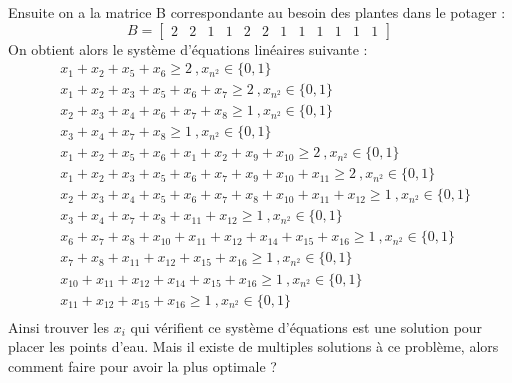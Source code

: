 \documentclass[french,a4paper]{article}
\begin{document}
\newline
Ensuite on a la matrice B correspondante au besoin des plantes dans le potager :
\newline
\[B = \begin{bmatrix} 2 & 2 & 1 & 1 & 2 & 2 & 1 & 1 & 1 & 1 & 1 & 1 \end{bmatrix}\]
\newline
On obtient alors le système d'équations linéaires suivante :
\newline
\begin{equation}
    \begin{aligned}
         & x_1+x_2+x_5+x_6 \ge 2 \ , x_{n^2} \in \{0,1\}                                       \\
         & x_1+x_2+x_3+x_5+x_6+x_7 \ge 2 \ , x_{n^2} \in \{0,1\}                               \\
         & x_2+x_3+x_4+x_6+x_7+x_8 \ge 1 \ , x_{n^2} \in \{0,1\}                               \\
         & x_3+x_4+x_7+x_8 \ge 1 \ , x_{n^2} \in \{0,1\}                                       \\
         & x_1+x_2+x_5+x_6+x_1+x_2+x_9+x_{10} \ge 2 \ , x_{n^2} \in \{0,1\}                    \\
         & x_1+x_2+x_3+x_5+x_6+x_7+x_9+x_{10}+x_{11} \ge 2 \ , x_{n^2} \in \{0,1\}             \\
         & x_2+x_3+x_4+x_5+x_6+x_7+x_8+x_{10}+x_{11}+x_{12} \ge 1 \ , x_{n^2} \in \{0,1\}      \\
         & x_3+x_4+x_7+x_8+x_{11}+x_{12} \ge 1 \ , x_{n^2} \in \{0,1\}                         \\
         & x_6+x_7+x_8+x_{10}+x_{11}+x_{12}+x_{14}+x_{15}+x_{16} \ge 1 \ , x_{n^2} \in \{0,1\} \\
         & x_7+x_8+x_{11}+x_{12}+x_{15}+x_{16} \ge 1 \ , x_{n^2} \in \{0,1\}                   \\
         & x_{10}+x_{11}+x_{12}+x_{14}+x_{15}+x_{16} \ge 1 \ , x_{n^2} \in \{0,1\}             \\
         & x_{11}+x_{12}+x_{15}+x_{16} \ge 1 \ , x_{n^2} \in \{0,1\}                           \\
    \end{aligned}
\end{equation}
\newline
Ainsi trouver les $x_i$ qui vérifient ce système d'équations est une solution pour placer les points d'eau.
Mais il existe de multiples solutions à ce problème, alors comment faire pour avoir la plus optimale ?
\end{document}
